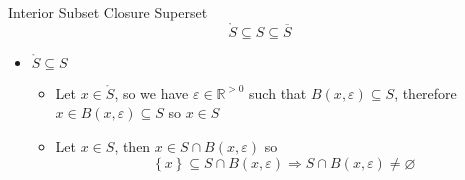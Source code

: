 \begin{theo*}{Interior Subset Closure Superset}
  \[
    \mathring{S} \subseteq S \subseteq \overline{S}
  \]
  \begin{pf}
    \begin{itemize}
      \item $\mathring{S} \subseteq S$ 
        \begin{itemize}
          \item Let $x \in \mathring{S}$, so we have $\varepsilon \in \mathbb{R} ^{>0}$ such that $B\left(x, \varepsilon\right) \subseteq S$, therefore $x \in B\left(x, \varepsilon\right) \subseteq S$ so $x \in S$ 
          \item Let $x \in S$, then $x \in S \cap B\left(x, \varepsilon\right)$ so 
            \[
            \left\{ x \right\} \subseteq S \cap B\left(x, \varepsilon \right) \Rightarrow S \cap B\left(x, \varepsilon \right) \neq \varnothing
            \]
        \end{itemize}
    \end{itemize}
  \end{pf}
\end{theo*}
